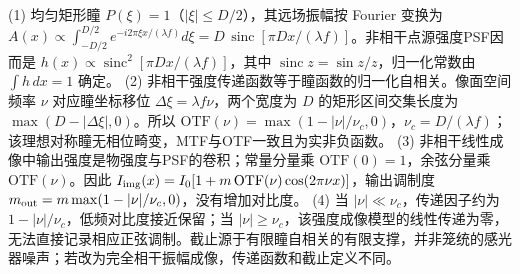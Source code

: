 (1) 均匀矩形瞳 \(P(\xi)=1\)（\(|\xi|\le D/2\)），其远场振幅按 Fourier 变换为 \(A(x)\propto\int_{-D/2}^{D/2}e^{-i2\pi \xi x/(\lambda f)}d\xi=D\,\operatorname{sinc}[\pi D x/(\lambda f)]\)。非相干点源强度PSF因而是 \(h(x)\propto\operatorname{sinc}^2[\pi D x/(\lambda f)]\)，其中 \(\operatorname{sinc}z=\sin z/z\)，归一化常数由 \(\int h\,dx=1\) 确定。
(2) 非相干强度传递函数等于瞳函数的归一化自相关。像面空间频率 \(\nu\) 对应瞳坐标移位 \(\Delta\xi=\lambda f\nu\)，两个宽度为 \(D\) 的矩形区间交集长度为 \(\max(D-|\Delta\xi|,0)\)。所以 \(\mathrm{OTF}(\nu)=\max(1-|\nu|/\nu_c,0)\)，\(\nu_c=D/(\lambda f)\)；该理想对称瞳无相位畸变，MTF与OTF一致且为实非负函数。
(3) 非相干线性成像中输出强度是物强度与PSF的卷积；常量分量乘 \(\mathrm{OTF}(0)=1\)，余弦分量乘 \(\mathrm{OTF}(\nu)\)。因此 \(I_{\rm img}(x)=I_0[1+m\,\mathrm{OTF}(\nu)\cos(2\pi\nu x)]\)，输出调制度 \(m_{\rm out}=m\max(1-|\nu|/\nu_c,0)\)，没有增加对比度。
(4) 当 \(|\nu|\ll\nu_c\)，传递因子约为 \(1-|\nu|/\nu_c\)，低频对比度接近保留；当 \(|\nu|\ge\nu_c\)，该强度成像模型的线性传递为零，无法直接记录相应正弦调制。截止源于有限瞳自相关的有限支撑，并非笼统的感光器噪声；若改为完全相干振幅成像，传递函数和截止定义不同。
